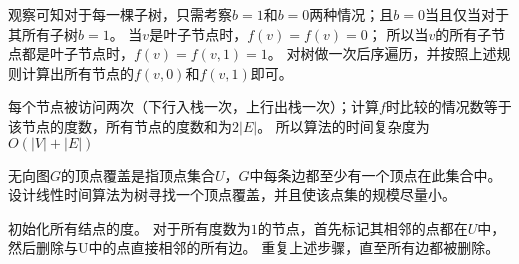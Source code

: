 \documentclass[answers]{exam}
\begin{document}
\begin{questions}
\begin{solution}
        观察可知对于每一棵子树，只需考察$b=1$和$b=0$两种情况；且$b=0$当且仅当对于其所有子树$b=1$。
        当$v$是叶子节点时，$f(v) = f(v) = 0$；
        所以当$v$的所有子节点都是叶子节点时，$f(v) = f(v, 1) = 1$。
        对树做一次后序遍历，并按照上述规则计算出所有节点的$f(v,0)和f(v,1)$即可。
        
        每个节点被访问两次（下行入栈一次，上行出栈一次）；计算$f$时比较的情况数等于该节点的度数，所有节点的度数和为$2|E|$。
        所以算法的时间复杂度为$O(|V|+|E|)$
    \end{solution}

    \question 无向图$G$的顶点覆盖是指顶点集合$U$，$G$中每条边都至少有一个顶点在此集合中。
    设计线性时间算法为树寻找一个顶点覆盖，并且使该点集的规模尽量小。

    \begin{solution}
        初始化所有结点的度。
        对于所有度数为$1$的节点，首先标记其相邻的点都在$U$中，然后删除与U中的点直接相邻的所有边。
        重复上述步骤，直至所有边都被删除。

    \end{solution}

\end{questions}
\end{document}
